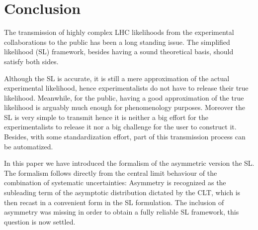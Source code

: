 \documentclass[11pt]{article}
\begin{document}
%


\section{Conclusion}


The transmission of highly complex LHC likelihoods 
from the experimental collaborations to the public
 has been a long standing issue.  The simplified likelihood (SL) framework, besides having a sound theoretical basis, should satisfy both sides.


Although the SL is  accurate, it is still a mere approximation of the actual experimental likelihood, hence experimentalists do not have to release their true likelihood. Meanwhile, for the public, having a good approximation of the true likelihood is arguably much enough for phenomenology purposes. 
Moreover the SL is very simple to transmit  hence it is neither a big effort for the experimentalists to release it nor a big challenge for the user to construct it.  Besides, with some standardization effort, part of this transmission process can be automatized. 

In this paper we have introduced the formalism of the asymmetric version the SL. 
The formalism follows directly from the central limit behaviour of the combination of systematic uncertainties: Asymmetry is recognized  as the subleading term of the asymptotic distribution dictated by the CLT, which is then recast in a convenient form in the SL formulation. 
The inclusion of asymmetry was missing in order to obtain a fully reliable SL framework, this question is now settled. 
\end{document}
